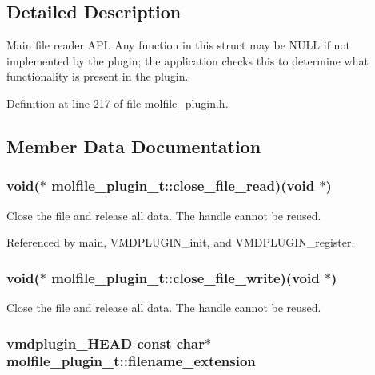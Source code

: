 \subsection{Detailed Description}
Main file reader API. Any function in this struct may be NULL if not implemented by the plugin; the application checks this to determine what functionality is present in the plugin. 



Definition at line 217 of file molfile\_\-plugin.h.

\subsection{Member Data Documentation}
\subsubsection{\setlength{\rightskip}{0pt plus 5cm}void($\ast$  molfile\_\-plugin\_\-t::close\_\-file\_\-read)(void $\ast$)}\label{structmolfile__plugin__t_m5}


Close the file and release all data. The handle cannot be reused. 

Referenced by main, VMDPLUGIN\_\-init, and VMDPLUGIN\_\-register.
\subsubsection{\setlength{\rightskip}{0pt plus 5cm}void($\ast$  molfile\_\-plugin\_\-t::close\_\-file\_\-write)(void $\ast$)}\label{structmolfile__plugin__t_m9}


Close the file and release all data. The handle cannot be reused. 
\subsubsection{\setlength{\rightskip}{0pt plus 5cm}vmdplugin\_\-HEAD const char$\ast$ molfile\_\-plugin\_\-t::filename\_\-extension}\label{structmolfile__plugin__t_m0}



